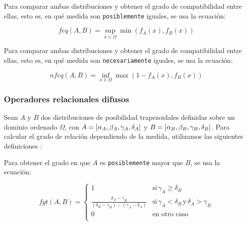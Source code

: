 \begin{definition}
Para comparar ambas distribuciones y obtener el grado de compatibilidad entre ellas, esto es, en qué medida son \texttt{posiblemente} iguales, se usa la ecuación:

\begin{equation}
    feq(A,B) = \sup_{x \in \Omega} \min (f_A(x), f_B(x))
\end{equation}
\end{definition}

\begin{definition}
Para comparar ambas distribuciones y obtener el grado de compatibilidad entre ellas, esto es, en qué medida son \texttt{necesariamente} iguales, se usa la ecuación:

\begin{equation}
    nfeq(A,B) = \inf_{x \in \Omega} \max (1-f_A(x), f_B(x))
\end{equation}
\end{definition}


\subsubsection{Operadores relacionales difusos}

Sean $A$ y $B$ dos distribuciones de posibilidad trapezoidales definidas sobre un dominio ordenado $\Omega$, con $A = [\alpha_A, \beta_A, \gamma_A, \delta_A]$ y $B=[\alpha_B, \beta_B, \gamma_B, \delta_B]$. Para calcular el grado de relación dependiendo de la medida, utilizamos las siguientes definiciones \cite{tesispepe}:

\begin{definition}
Para obtener el grado en que $A$ es \texttt{posiblemente} mayor que $B$, se usa la ecuación:

\begin{equation}
    fgt(A,B) = \left\{ { \begin{array}{ll}
                    1 & \text{si}\, \gamma_A \geq \delta_B \\ 
                    \frac{\delta_A - \gamma_B}{(\delta_B - \gamma_B)-(\gamma_A - \delta_A)} & \text{si}\, \gamma_A < \delta_B \, \text{y} \, \delta_A > \gamma_B \\
                    0 & \text{en otro caso} \\ 
                    \end{array}  } \right.
\end{equation}
\end{definition}

